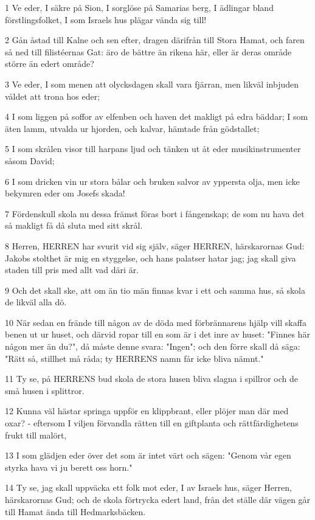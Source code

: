 \par 1 Ve eder, I säkre på Sion, I sorglöse på Samarias berg, I ädlingar bland förstlingsfolket, I som Israels hus plägar vända sig till!
\par 2 Gån åstad till Kalne och sen efter, dragen därifrån till Stora Hamat, och faren så ned till filistéernas Gat: äro de bättre än rikena här, eller är deras område större än edert område?
\par 3 Ve eder, I som menen att olycksdagen skall vara fjärran, men likväl inbjuden våldet att trona hos eder;
\par 4 I som liggen på soffor av elfenben och haven det makligt på edra bäddar; I som äten lamm, utvalda ur hjorden, och kalvar, hämtade från gödstallet;
\par 5 I som skrålen visor till harpans ljud och tänken ut åt eder musikinstrumenter såsom David;
\par 6 I som dricken vin ur stora bålar och bruken salvor av yppersta olja, men icke bekymren eder om Josefs skada!
\par 7 Fördenskull skola nu dessa främst föras bort i fångenskap; de som nu hava det så makligt få då sluta med sitt skrål.
\par 8 Herren, HERREN har svurit vid sig själv, säger HERREN, härskarornas Gud: Jakobs stolthet är mig en styggelse, och hans palatser hatar jag; jag skall giva staden till pris med allt vad däri är.
\par 9 Och det skall ske, att om än tio män finnas kvar i ett och samma hus, så skola de likväl alla dö.
\par 10 När sedan en frände till någon av de döda med förbrännarens hjälp vill skaffa benen ut ur huset, och därvid ropar till en som är i det inre av huset: "Finnes här någon mer än du?", då måste denne svara: "Ingen"; och den förre skall då säga: "Rätt så, stillhet må råda; ty HERRENS namn får icke bliva nämnt."
\par 11 Ty se, på HERRENS bud skola de stora husen bliva slagna i spillror och de små husen i splittror.
\par 12 Kunna väl hästar springa uppför en klippbrant, eller plöjer man där med oxar? - eftersom I viljen förvandla rätten till en giftplanta och rättfärdighetens frukt till malört,
\par 13 I som glädjen eder över det som är intet värt och sägen: "Genom vår egen styrka hava vi ju berett oss horn."
\par 14 Ty se, jag skall uppväcka ett folk mot eder, I av Israels hus, säger Herren, härskarornas Gud; och de skola förtrycka edert land, från det ställe där vägen går till Hamat ända till Hedmarksbäcken.

